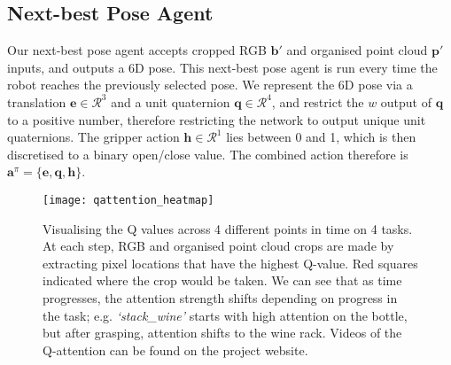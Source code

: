 \documentclass[letterpaper, 10 pt, journal, twoside]{IEEEtran}
\newcommand{\ba}{\mathbf{a}}
\newcommand{\aNbp}{\ba^\pi}
\newcommand{\rgb}{\mathbf{b}}
\newcommand{\pcd}{\mathbf{p}}
\newcommand{\vecXX}[1]{{\mathbf {#1}}}
\def \vece {{\vecXX{e}}}
\def \vech {{\vecXX{h}}}
\def \vecq {{\vecXX{q}}}
\begin{document}
\subsection{Next-best Pose Agent}
\label{sec:phase2}

Our next-best pose agent accepts cropped RGB $\rgb'$ and organised point cloud $\pcd'$ inputs, and outputs a 6D pose. This next-best pose agent is run every time the robot reaches the previously selected pose. We represent the 6D pose via a translation $\vece \in \mathcal{R}^3$ and a unit quaternion $\vecq \in \mathcal{R}^4$, and restrict the $w$ output of $\vecq$ to a positive number, therefore restricting the network to output unique unit quaternions. The gripper action $\vech \in \mathcal{R}^1$ lies between 0 and 1, which is then discretised to a binary open/close value. The combined action therefore is $\aNbp = \{\vece, \vecq, \vech\}$.

\begin{figure}
\centering
\texttt{[image: qattention\_heatmap]}
\caption{Visualising the Q values across 4 different points in time on 4 tasks. At each step, RGB and organised point cloud crops are made by extracting pixel locations that have the highest Q-value. Red squares indicated where the crop would be taken. We can see that as time progresses, the attention strength shifts depending on progress in the task; e.g. \textit{`stack\_wine'} starts with high attention on the bottle, but after grasping, attention shifts to the wine rack. Videos of the Q-attention can be found on the project website.}
\label{fig:Q-attention_vis}
\vspace{-15pt}
\end{figure}
\end{document}
